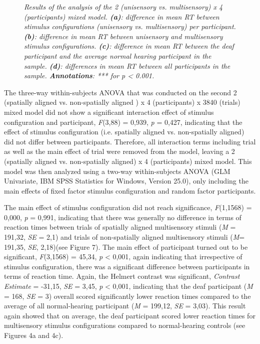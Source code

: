 \documentclass[12pt]{article}
\begin{document}
\begin{figure}[h!]
\begin{subfigure}[b]{0.475\textwidth}
            \caption[]%
            {{\small}}    
            \label{fig:4d}
        \end{subfigure}
        \caption[]%
        {\textit{\footnotesize{Results of the analysis of the 2 (unisensory vs. multisensory) x 4 (participants) mixed
model. \textbf{(a)}: difference in mean RT between stimulus configurations (unisensory vs. multisensory) per participant. \textbf{(b)}: difference in mean RT between unisensory and multisensory stimulus configurations. \textbf{(c)}: difference in mean RT between the deaf participant and the average normal hearing participant in the sample. \textbf{(d)}: differences in mean RT between all participants in the sample. \textbf{Annotations}: *** for \textit{p} < 0.001.}}} 
        \label{fig:mean and std of nets}
\end{figure}
%
\par The three-way within-subjects ANOVA that was conducted on the second 2 (spatially aligned vs. non-spatially aligned ) x 4 (participants) x 3840 (trials) mixed model did not show a significant interaction effect of stimulus configuration and participant, \textit{F}(3,88) = 0,939, \textit{p} = 0,427, indicating that the effect of stimulus configuration (i.e. spatially aligned vs. non-spatially aligned) did not differ between participants. Therefore, all interaction terms including trial as well as the main effect of trial were removed from the model, leaving a 2 (spatially aligned vs. non-spatially aligned) x 4 (participants) mixed model. This model was then analyzed using a two-way within-subjects ANOVA (GLM Univariate, IBM SPSS Statistics for Windows, Version 25.0), only including the main effects of fixed factor stimulus configuration and random factor participants. 
%
\par The main effect of stimulus configuration did not reach significance, \textit{F}(1,1568) = 0,000, \textit{p} = 0,991, indicating that there was generally no difference in terms of reaction times between trials of spatially aligned multisensory stimuli (\textit{M} = 191,32, \textit{SE} = 2,1) and trials of non-spatially aligned multisensory stimuli (\textit{M}= 191,35, \textit{SE}, 2,18)(see Figure 7). The main effect of participant turned out to be significant, \textit{F}(3,1568) = 45,34, \textit{p} < 0,001, again indicating that irrespective of stimulus configuration, there was a significant difference between participants in terms of reaction time. Again, the Helmert contrast was significant, \textit{Contrast Estimate} = -31,15, \textit{SE} = 3,45, \textit{p} < 0,001, indicating that the deaf participant (\textit{M} = 168, \textit{SE} = 3) overall scored significantly lower reaction times compared to the average of all normal-hearing participant (\textit{M} = 199,12, \textit{SE} = 3,03). This result again showed that on average, the deaf participant scored lower reaction times for multisensory stimulus configurations compared to normal-hearing controls (see Figures 4a and 4c).
\end{document}
